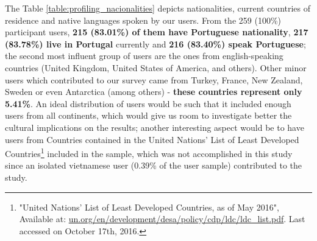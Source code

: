 %
The Table \ref{table:profiling_nacionalities} depicts nationalities, current countries of residence and native languages spoken by our users. From the 259 (100\%) participant users,
\textbf{215 (83.01\%) of them have Portuguese nationality}, \textbf{217 (83.78\%) live in Portugal} currently and \textbf{216 (83.40\%) speak Portuguese}; the second most influent group of users are the ones from english-speaking
countries (United Kingdom, United States of America, and others). Other minor users which contributed to our survey came from Turkey, France, New Zealand, Sweden or even Antarctica (among others) -
\textbf{these countries represent only 5.41\%}. An ideal distribution of users would be such that it included enough users from all continents, which would give us room to investigate better the cultural
implications on the results; another interesting aspect would be to have users from Countries contained in the United Nations' List of Least Developed Countries\footnote{"United Nations' List of Least Developed Countries, as of May
2016", Available at: \url{un.org/en/development/desa/policy/cdp/ldc/ldc_list.pdf}. Last accessed on October 17th, 2016.} included in the sample, which was not accomplished in this study since an isolated vietnamese
user (0.39\% of the user sample) contributed to the study.
%
